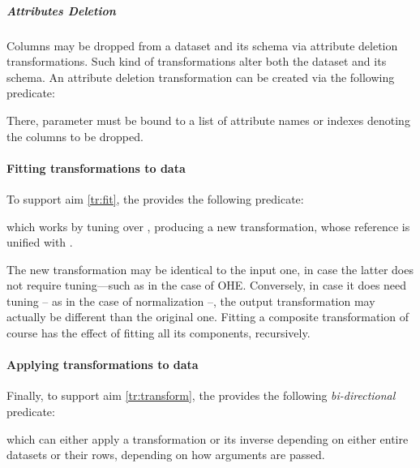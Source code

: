 \documentclass[12pt,a4paper,openright,twoside]{book}
\begin{document}
\subparagraph{Attributes Deletion}

Columns may be dropped from a dataset and its schema via attribute deletion transformations.
%
Such kind of transformations alter both the dataset and its schema.
%
An attribute deletion transformation can be created via the following predicate:
%
\begin{center}
\end{center}
%
There, parameter  must be bound to a list of attribute names or indexes denoting the columns to be dropped.

\paragraph{Fitting transformations to data}

To support aim \ref{tr:fit}, the \mllib{} provides the following predicate:
%
\begin{center}
\end{center}
%
which works by tuning  over , producing a new transformation, whose reference is unified with .

The new transformation may be identical to the input one, in case the latter does not require tuning---such as in the case of OHE.
%
Conversely, in case it does need tuning -- as in the case of normalization --, the output transformation may actually be different than the original one.
%
Fitting a composite transformation of course has the effect of fitting all its components, recursively.

\paragraph{Applying transformations to data}

Finally, to support aim \ref{tr:transform}, the \mllib{} provides the following \emph{bi-directional} predicate:
%
\begin{center}
\end{center}
%
which can either apply a transformation or its inverse depending on either entire datasets or their rows, depending on how arguments are passed.
\end{document}
